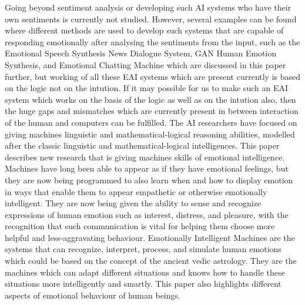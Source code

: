 Going beyond sentiment analysis or developing such AI systems who have their own sentiments is currently not studied. However, several examples can be found where different methods are used to develop such systems that are capable of responding emotionally after analysing the sentiments from the input, such as the Emotional Speech Synthesis News Dialogue System, GAN Human Emotion Synthesis, and Emotional Chatting Machine which are discussed in this paper further, but working of all these EAI systems which are present currently is based on the logic not on the intution. If it may possible for us to make such an EAI system which works on the basis of the logic as well as on the intution also, then the huge gaps and mismatches which are currently present in between interaction of the human and computers can be fulfilled. The AI researchers have focused on giving machines linguistic and mathematical-logical reasoning abilities, modelled after the classic linguistic and mathematical-logical intelligences. This paper describes new research that is giving machines skills of emotional intelligence. Machines have long been able to appear as if they have emotional feelings, but they are now being programmed to also learn when and how to display emotion in ways that enable them to appear empathetic or otherwise emotionally intelligent. They are now being given the ability to sense and recognize expressions of human emotion such as interest, distress, and pleasure, with the recognition that such communication is vital for helping them choose more helpful and less-aggravating behaviour. Emotionally Intelligent Machines are the systems that can recognize, interpret, process, and simulate human emotions which could be based on the concept of the ancient vedic astrology. They are the machines which can adapt different situations and knows how to handle these situations more intelligently and smartly. This paper also highlights different aspects of emotional behaviour of human beings.